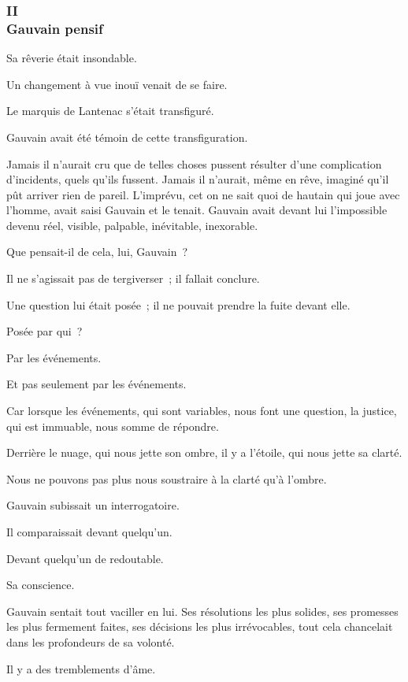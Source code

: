 \documentclass[french,twoside]{book} %
\begin{document}
 \subsubsection[{II. Gauvain pensif}]{II \\
Gauvain pensif}
\label{p3l6c2}
\noindent Sa rêverie était insondable.\par
Un changement à vue inouï venait de se faire.\par
Le marquis de Lantenac s’était transfiguré.\par
Gauvain avait été témoin de cette transfiguration.\par
Jamais il n’aurait cru que de telles choses pussent résulter d’une complication d’incidents, quels qu’ils fussent. Jamais il n’aurait, même en rêve, imaginé qu’il pût arriver rien de pareil. L’imprévu, cet on ne sait quoi de hautain qui joue avec l’homme, avait saisi Gauvain et le tenait. Gauvain avait devant lui l’impossible devenu réel, visible, palpable, inévitable, inexorable.\par
Que pensait-il de cela, lui, Gauvain ?\par
Il ne s’agissait pas de tergiverser ; il fallait conclure.\par
Une question lui était posée ; il ne pouvait prendre la fuite devant elle.\par
Posée par qui ?\par
Par les événements.\par
Et pas seulement par les événements.\par
Car lorsque les événements, qui sont variables,  nous font une question, la justice, qui est immuable, nous somme de répondre.\par
Derrière le nuage, qui nous jette son ombre, il y a l’étoile, qui nous jette sa clarté.\par
Nous ne pouvons pas plus nous soustraire à la clarté qu’à l’ombre.\par
Gauvain subissait un interrogatoire.\par
Il comparaissait devant quelqu’un.\par
Devant quelqu’un de redoutable.\par
Sa conscience.\par
Gauvain sentait tout vaciller en lui. Ses résolutions les plus solides, ses promesses les plus fermement faites, ses décisions les plus irrévocables, tout cela chancelait dans les profondeurs de sa volonté.\par
Il y a des tremblements d’âme.\par
\end{document}

